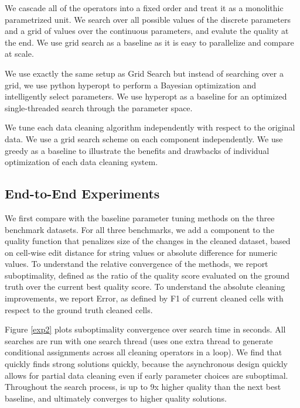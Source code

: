  We cascade all of the operators into a fixed order and treat it as a monolithic parametrized unit. We search over all possible values of the discrete parameters and a grid of values over the continuous parameters, and evalute the quality at the end. We use grid search as a baseline as it is easy to parallelize and compare at scale.

 We use exactly the same setup as Grid Search but instead of searching over a grid,  we use python hyperopt to perform a Bayesian optimization and intelligently select parameters. We use hyperopt as a baseline for an optimized single-threaded search through the parameter space.

 We tune each data cleaning algorithm independently with respect to the original data. We use a grid search scheme on each component independently. We use greedy as a baseline to illustrate the benefits and drawbacks of individual optimization of each data cleaning system.



\subsection{End-to-End Experiments}
We first compare \sys with the baseline parameter tuning methods on the three benchmark datasets.   For all three benchmarks, we add a component to the quality function that penalizes size of the changes in the cleaned dataset, based on cell-wise edit distance for string values or absolute difference for numeric values.    To understand the  relative convergence of the methods, we report suboptimality, defined as the ratio of the quality score evaluated on the ground truth over the current best quality score.  To understand the absolute cleaning improvements, we report Error, as defined by F1 of current cleaned cells with respect to the ground truth cleaned cells.

Figure \ref{exp2} plots suboptimality convergence over search time in seconds.
All searches are run with one search thread (\sys uses one extra thread to generate conditional assignments across all cleaning operators in a loop).  
We find that \sys quickly finds strong solutions quickly, because the asynchronous design quickly allows for partial data cleaning even if early parameter choices are suboptimal.
Throughout the search process, \sys is up to 9x higher quality than the next best baseline, and ultimately converges to higher quality solutions.  


